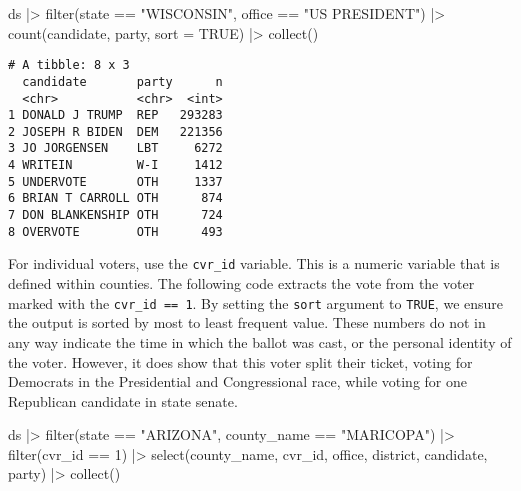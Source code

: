 \documentclass[fleqn,10pt]{wlscirep}
\newenvironment{Shaded}{\begin{snugshade}}{\end{snugshade}}
\newcommand{\AttributeTok}[1]{\textcolor[rgb]{0.40,0.45,0.13}{#1}}
\newcommand{\ConstantTok}[1]{\textcolor[rgb]{0.56,0.35,0.01}{#1}}
\newcommand{\DecValTok}[1]{\textcolor[rgb]{0.68,0.00,0.00}{#1}}
\newcommand{\FunctionTok}[1]{\textcolor[rgb]{0.28,0.35,0.67}{#1}}
\newcommand{\NormalTok}[1]{\textcolor[rgb]{0.00,0.23,0.31}{#1}}
\newcommand{\SpecialCharTok}[1]{\textcolor[rgb]{0.37,0.37,0.37}{#1}}
\newcommand{\StringTok}[1]{\textcolor[rgb]{0.13,0.47,0.30}{#1}}
\begin{document}
\begin{Shaded}
\begin{Highlighting}[]
\NormalTok{ds }\SpecialCharTok{|\textgreater{}} 
  \FunctionTok{filter}\NormalTok{(state }\SpecialCharTok{==} \StringTok{"WISCONSIN"}\NormalTok{, office }\SpecialCharTok{==} \StringTok{"US PRESIDENT"}\NormalTok{) }\SpecialCharTok{|\textgreater{}} 
  \FunctionTok{count}\NormalTok{(candidate, party, }\AttributeTok{sort =} \ConstantTok{TRUE}\NormalTok{) }\SpecialCharTok{|\textgreater{}} 
  \FunctionTok{collect}\NormalTok{()}
\end{Highlighting}
\end{Shaded}

\begin{verbatim}
# A tibble: 8 x 3
  candidate       party      n
  <chr>           <chr>  <int>
1 DONALD J TRUMP  REP   293283
2 JOSEPH R BIDEN  DEM   221356
3 JO JORGENSEN    LBT     6272
4 WRITEIN         W-I     1412
5 UNDERVOTE       OTH     1337
6 BRIAN T CARROLL OTH      874
7 DON BLANKENSHIP OTH      724
8 OVERVOTE        OTH      493
\end{verbatim}

For individual voters, use the \texttt{cvr\_id} variable. This is a
numeric variable that is defined within counties. The following code
extracts the vote from the voter marked with the
\texttt{cvr\_id\ ==\ 1}. By setting the \texttt{sort} argument to
\texttt{TRUE}, we ensure the output is sorted by most to least frequent
value. These numbers do not in any way indicate the time in which the
ballot was cast, or the personal identity of the voter. However, it does
show that this voter split their ticket, voting for Democrats in the
Presidential and Congressional race, while voting for one Republican
candidate in state senate.

\begin{Shaded}
\begin{Highlighting}[]
\NormalTok{ds }\SpecialCharTok{|\textgreater{}} 
  \FunctionTok{filter}\NormalTok{(state }\SpecialCharTok{==} \StringTok{"ARIZONA"}\NormalTok{, county\_name }\SpecialCharTok{==} \StringTok{"MARICOPA"}\NormalTok{) }\SpecialCharTok{|\textgreater{}} 
  \FunctionTok{filter}\NormalTok{(cvr\_id }\SpecialCharTok{==} \DecValTok{1}\NormalTok{) }\SpecialCharTok{|\textgreater{}} 
  \FunctionTok{select}\NormalTok{(county\_name, cvr\_id, office, district, candidate, party) }\SpecialCharTok{|\textgreater{}} 
  \FunctionTok{collect}\NormalTok{()}
\end{Highlighting}
\end{Shaded}
\end{document}
